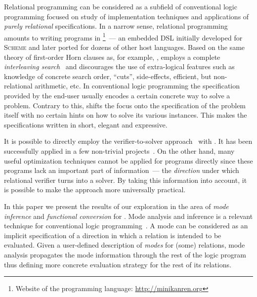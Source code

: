 Relational programming can be considered as a subfield of conventional logic programming focused on study of implementation techniques and applications of \emph{purely relational} specifications.
In a narrow sense, relational programming amounts to writing programs in \mk\footnote{Website of the \mk programming language: \url{http://minikanren.org}}~--- an embedded DSL initially developed for \textsc{Scheme} and later ported for dozens of other host languages.
Based on the same theory of first-order Horn clauses as, for example, \prolog, \mk employs a complete \emph{interleaving search}~\cite{kiselyov2005backtracking, rozplokhas2020certified} and discourages the use of extra-logical features such as knowledge of concrete search order, ``cuts'', side-effects, efficient, but non-relational arithmetic, etc.
In conventional logic programming the specification provided by the end-user usually encodes a certain concrete way to solve a problem.
Contrary to this, \mk shifts the focus onto the specification of the problem itself with no certain hints on how to solve its various instances.
This makes the specifications written in \mk short, elegant and expressive.

It is possible to directly employ the verifier-to-solver approach~\cite{byrd2017unified,kosarev2020relational} with \mk.
It has been successfully applied in a few non-trivial projects~\cite{kosarev2022declarative,lozov2023relational}.
On the other hand, many useful optimization techniques cannot be applied for \mk programs directly since these programs lack an important part of information~--- the \emph{direction} under which relational verifier turns into a solver.
By taking this information into account, it is possible to make the approach more universally practical.

In this paper we present the results of our exploration in the area of \emph{mode inference} and \emph{functional conversion} for \mk.
Mode analysis and inference is a relevant technique for conventional logic programming~\cite{debray1988automatic,somogyi1987system,overton2002constraint}.
A mode can be considered as an implicit specification of a direction in which a relation is intended to be evaluated.
Given a user-defined description of \emph{modes} for (some) relations, mode analysis propagates the mode information through the rest of the logic program thus defining more concrete evaluation strategy for the rest of its relations.

